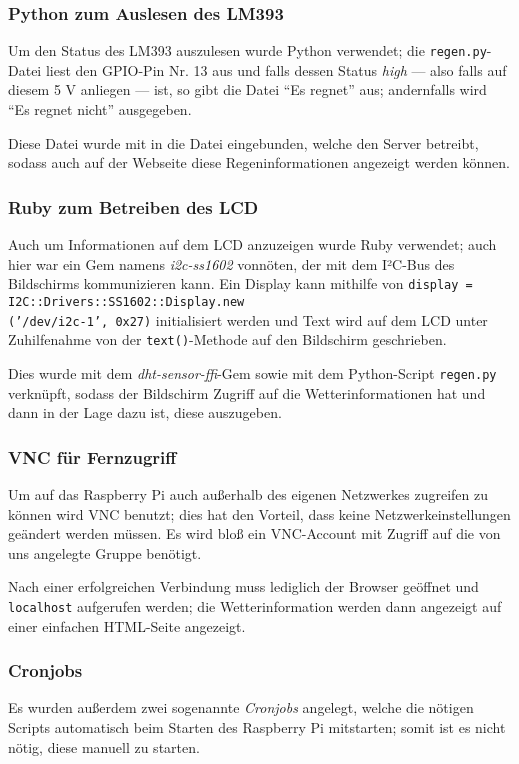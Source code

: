 \documentclass[a4paper,12pt]{article}
\begin{document}
\subsubsection{Python zum Auslesen des LM393}
Um den Status des LM393 auszulesen wurde Python verwendet; die \texttt{regen.py}-Datei liest den GPIO-Pin Nr. 13 aus und falls dessen Status \textit{high} — also falls auf diesem 5 V anliegen — ist, so gibt die Datei "`Es regnet"' aus; andernfalls wird "`Es regnet nicht"' ausgegeben.

Diese Datei wurde mit in die Datei eingebunden, welche den Server betreibt, sodass auch auf der Webseite diese Regeninformationen angezeigt werden können.

\subsubsection{Ruby zum Betreiben des LCD}
Auch um Informationen auf dem LCD anzuzeigen wurde Ruby verwendet; auch hier war ein Gem namens \textit{i2c-ss1602} vonnöten, der mit dem I²C-Bus des Bildschirms kommunizieren kann.
Ein Display kann mithilfe von \texttt{display = I2C::Drivers::SS1602::Display.new\\('/dev/i2c-1', 0x27)} initialisiert werden und Text wird auf dem LCD unter Zuhilfenahme von der \texttt{text()}-Methode auf den Bildschirm geschrieben.

Dies wurde mit dem \textit{dht-sensor-ffi}-Gem sowie mit dem Python-Script \texttt{regen.py} verknüpft, sodass der Bildschirm Zugriff auf die Wetterinformationen hat und dann in der Lage dazu ist, diese auszugeben.

\subsubsection{VNC für Fernzugriff}
Um auf das Raspberry Pi auch außerhalb des eigenen Netzwerkes zugreifen zu können wird VNC benutzt; dies hat den Vorteil, dass keine Netzwerkeinstellungen geändert werden müssen. Es wird bloß ein VNC-Account mit Zugriff auf die von uns angelegte Gruppe benötigt.

Nach einer erfolgreichen Verbindung muss lediglich der Browser geöffnet und \texttt{localhost} aufgerufen werden; die Wetterinformation werden dann angezeigt auf einer einfachen HTML-Seite angezeigt.

\subsubsection{Cronjobs}
Es wurden außerdem zwei sogenannte \textit{Cronjobs} angelegt, welche die nötigen Scripts automatisch beim Starten des Raspberry Pi mitstarten; somit ist es nicht nötig, diese manuell zu starten. 
\end{document}
